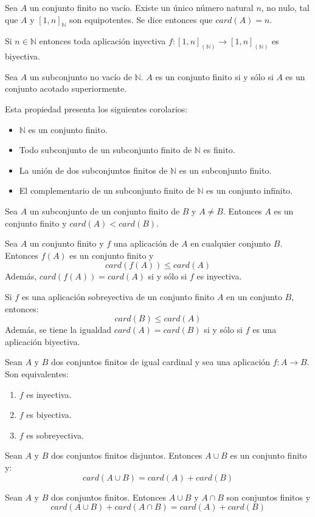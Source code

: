 Sea $A$ un conjunto finito no vacío. Existe un único número natural $n$, no nulo, tal que $A$ y $[1,n]_{\mathbb{N}}$ son equipotentes. Se dice entonces que $card(A)=n$.

Si $n \in \mathbb{N}$ entonces toda aplicación inyectiva $f: [1,n]_{\mathbb{(N)}} \longrightarrow [1,n]_{\mathbb{(N)}}$ es biyectiva.

Sea $A$ un subconjunto no vacío de $\mathbb{N}$. $A$ es un conjunto finito si y sólo si $A$ es un conjunto acotado superiormente.

Esta propiedad presenta los siguientes corolarios:
\begin{itemize}
	\item $\mathbb{N}$ es un conjunto finito.
	\item Todo subconjunto de un subconjunto finito de $\mathbb{N}$ es finito.
	\item La unión de dos subconjuntos finitos de $\mathbb{N}$ es un subconjunto finito.
	\item El complementario de un subconjunto finito de $\mathbb{N}$ es un conjunto infinito.
\end{itemize}

Sea $A$ un subconjunto de un conjunto finito de $B$ y $A \neq B$. Entonces $A$ es un conjunto finito y $card(A) < card(B)$.

Sea $A$ un conjunto finito y $f$ una aplicación de $A$ en cualquier conjunto $B$. Entonces $f(A)$ es un conjunto finito y
\[
card(f(A)) \leq card(A)
\]
Además, $card(f(A)) = card(A)$ si y sólo si $f$ es inyectiva.

Si $f$ es una aplicación sobreyectiva de un conjunto finito $A$ en un conjunto $B$, entonces:
\[
card(B) \leq card(A)
\]
Además, se tiene la igualdad $card(A)=card(B)$ si y sólo si $f$ es una aplicación biyectiva.

Sean $A$ y $B$ dos conjuntos finitos de igual cardinal y sea una aplicación $f: A \longrightarrow B$. Son equivalentes:
\begin{enumerate}
	\item $f$ es inyectiva.
	\item $f$ es biyectiva.
	\item $f$ es sobreyectiva.
\end{enumerate}

Sean $A$ y $B$ dos conjuntos finitos disjuntos. Entonces $A \cup B$ es un conjunto finito y:
\[
card(A \cup B) = card(A) + card(B)
\]

Sean $A$ y $B$ dos conjuntos finitos. Entonces $A \cup B$ y $A \cap B$ son conjuntos finitos y
\[
card(A \cup B) + card(A \cap B) = card(A) + card(B)
\]

